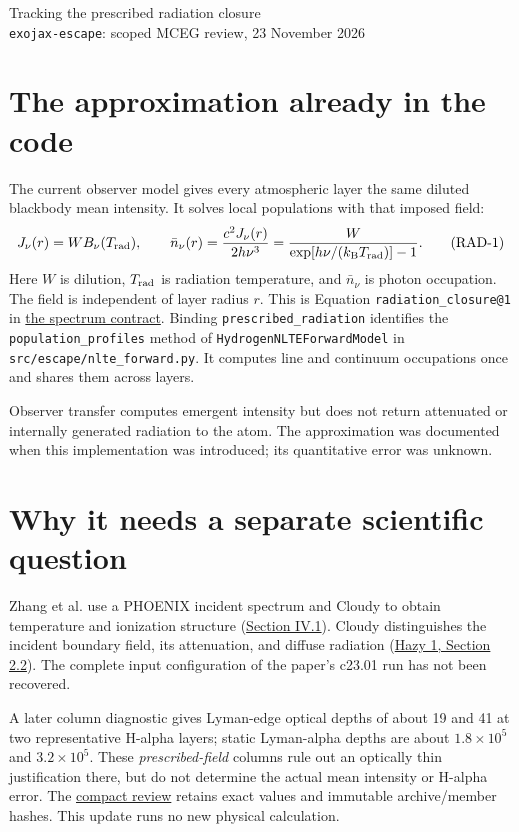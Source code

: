 \documentclass[10pt,a4paper]{article}
\begin{document}
\begin{center}
{\Large Tracking the prescribed radiation closure}\\[4pt]
\texttt{exojax-escape}: scoped MCEG review, 23 November 2026
\end{center}

\section{The approximation already in the code}
The current observer model gives every atmospheric layer the same diluted
blackbody mean intensity. It solves local populations with that imposed field:
\begin{equation}
 J_\nu(r)=W B_\nu(T_{\rm rad}),\qquad
 \bar n_\nu(r)=\frac{c^2J_\nu(r)}{2h\nu^3}
 =\frac{W}{\exp[h\nu/(k_{\rm B}T_{\rm rad})]-1}.
 \tag{RAD-1}\label{eq:radiation-closure}
\end{equation}
Here $W$ is dilution, $T_{\rm rad}$ is radiation temperature, and $\bar n_\nu$
is photon occupation. The field is independent of layer radius $r$. This is
Equation \texttt{radiation\_closure@1} in
\href{../mceg/contracts/escape.nlte_spectrum.yaml}{the spectrum contract}.
Binding \texttt{prescribed\_radiation} identifies the
\texttt{population\_profiles} method of \texttt{HydrogenNLTEForwardModel}
in \texttt{src/escape/nlte\_forward.py}. It computes line and continuum
occupations once and shares them across layers.

Observer transfer computes emergent intensity but does not return attenuated
or internally generated radiation to the atom. The approximation was documented
when this implementation was introduced; its quantitative error was unknown.

\section{Why it needs a separate scientific question}
Zhang et al. use a PHOENIX incident spectrum and Cloudy to obtain temperature
and ionization structure (\href{https://arxiv.org/html/2606.23899v1\#S4.SS1}{Section IV.1}).
Cloudy distinguishes the incident boundary field, its attenuation, and diffuse
radiation (\href{https://www.pa.uky.edu/~gary/CloudyWorkshop/CloudyWorkshop/16Shandong/Cloudy_files/hazy1.pdf}{Hazy 1, Section 2.2}).
The complete input configuration of the paper's c23.01 run has not been recovered.

A later column diagnostic gives Lyman-edge optical depths of about 19 and 41
at two representative H-alpha layers; static Lyman-alpha depths are about
$1.8\times10^5$ and $3.2\times10^5$. These \emph{prescribed-field} columns
rule out an optically thin justification there, but do not determine the actual
mean intensity or H-alpha error. The
\href{../mceg/evidence/radiation_review_20261123/review.json}{compact review}
retains exact values and immutable archive/member hashes. This update runs
no new physical calculation.
\end{document}
